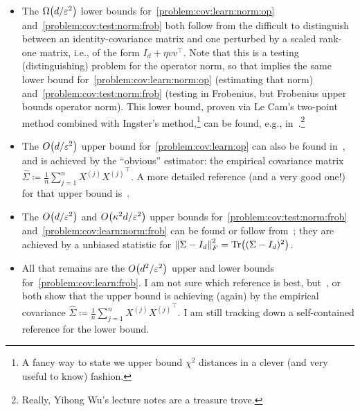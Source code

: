 \documentclass[10pt]{article}
\newcommand{\dst}{\varepsilon}
\newcommand{\ns}{n}
\newcommand{\dims}{d}
\renewcommand{\eqdef}{\coloneqq}
\theoremstyle{plain}
\begin{document}
\begin{itemize}
  \item
The $\bigOmega{\dims/\dst^2}$ lower bounds for~\autoref{problem:cov:learn:norm:op} and~\autoref{problem:cov:test:norm:frob} both follow from the difficult to distinguish between an identity-covariance matrix and one perturbed by a scaled rank-one matrix, i.e., of the form $I_\dims+\eta vv^\top$. Note that this is a testing (distinguishing) problem for the operator norm, so that implies the same lower bound for~\autoref{problem:cov:learn:norm:op} (estimating that norm) and~\autoref{problem:cov:test:norm:frob} (testing in Frobenius, but Frobenius upper bounds operator norm). This lower bound, proven via Le Cam's two-point method combined with Ingster's method,\footnote{A fancy way to state we upper bound $\chi^2$ distances in a clever (and very useful to know) fashion.} can be found, e.g., in~\cite[Section~24.2]{Wu17}.\footnote{Really, Yihong Wu's lecture notes are a treasure trove.}
  \item
The $\bigO{\dims/\dst^2}$ upper bound for~\autoref{problem:cov:learn:op} can also be found in~\cite[Section~24.2]{Wu17}, and is achieved by the ``obvious'' estimator: the empirical covariance matrix $\widehat{\Sigma}\eqdef \frac{1}{\ns}\sum_{j=1}^\ns X^{(j)}{X^{(j)}}^\top$. A more detailed reference (and a very good one!) for that upper bound is~\cite[Chapter~4.7]{Vershynin18}.
  \item
The $\bigO{\dims/\dst^2}$ and $\bigO{\kappa^2\dims/\dst^2}$ upper bounds for~\autoref{problem:cov:test:norm:frob} and~\autoref{problem:cov:learn:norm:frob} can be found or follow from~\cite{CaiM13}; they are achieved by a unbiased statistic for $\norm{\Sigma-I_\dims}_F^2 = \operatorname{Tr}\mleft((\Sigma-I_\dims)^2\mright)$.
  \item
  All that remains are the $\bigO{\dims^2/\dst^2}$ upper and lower bounds for~\autoref{problem:cov:learn:frob}. I am not sure which reference is best, but~\cite[Section~4.2.2]{DiakonikolasKKLMS16}, or~\cite[Corollary~2.1.12]{Li2018} both show that the upper bound is achieving (again) by the empirical covariance $\widehat{\Sigma}\eqdef \frac{1}{\ns}\sum_{j=1}^\ns X^{(j)}{X^{(j)}}^\top$. I am still tracking down a self-contained reference for the lower bound.
\end{itemize}
\end{document}
